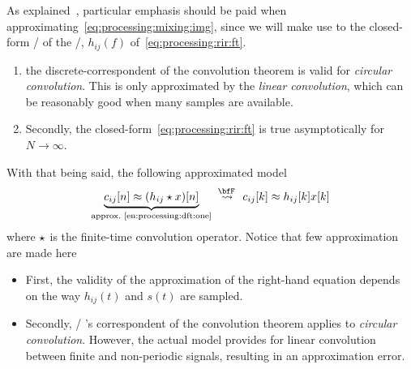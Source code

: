 As explained~\cite{tukuljac2018mulan}, particular emphasis should be paid when approximating~\cref{eq:processing:mixing:img},
since we will make use to the closed-form \FT/ of the \RIR/, $h_{ij}(f)$ of~\cref{eq:processing:rir:ft}.
\begin{enumerate}
    \item\label{en:processing:dft:one}
        the discrete-correspondent of the convolution theorem is valid for \textit{circular convolution}.
    This is only approximated by the \textit{linear convolution}, which can be reasonably good when many samples are available.
    \item\label{en:processing:dtf:two}
        Secondly, the closed-form~\cref{eq:processing:rir:ft} is true asymptotically for $N\to\infty$.
\end{enumerate}
With that being said, the following approximated model
\begin{equation}
    \underbrace{c_{ij}[n] \approx (h_{ij} \convDis x)[n]}_{\text{approx.~\ref{en:processing:dft:one}}}
    \;\overset{\discreteFT{}}{\leadsto}\;
    c_{ij}[k] \approx h_{ij}[k] x[k]
\end{equation}
where $\star$ is the finite-time convolution operator.
Notice that few approximation are made here
\begin{itemize}
    \item First, the validity of the approximation of the right-hand equation depends on the way $h_{ij}(t)$ and $s(t)$ are sampled.
    \item Secondly, \DFT/ 's correspondent of the convolution theorem applies to \textit{circular convolution}.
          However, the actual model provides for linear convolution between finite and non-periodic signals, resulting in an approximation error.
\end{itemize}


%
%


